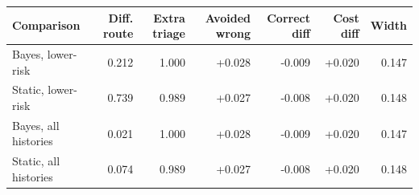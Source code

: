 \begin{tabular}{@{}lrrrrrr@{}}
\toprule
Comparison & Diff. route & Extra triage & Avoided wrong & Correct diff & Cost diff & Width\\
\midrule
Bayes, lower-risk & 0.212 & 1.000 & +0.028 & -0.009 & +0.020 & 0.147\\
Static, lower-risk & 0.739 & 0.989 & +0.027 & -0.008 & +0.020 & 0.148\\
Bayes, all histories & 0.021 & 1.000 & +0.028 & -0.009 & +0.020 & 0.147\\
Static, all histories & 0.074 & 0.989 & +0.027 & -0.008 & +0.020 & 0.148\\
\bottomrule
\end{tabular}

